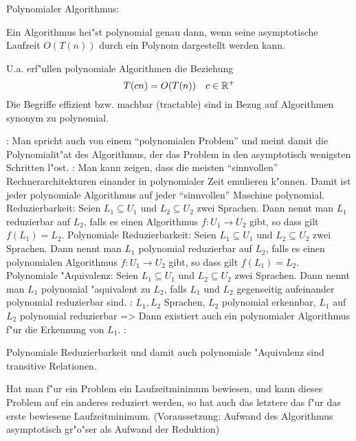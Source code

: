  Polynomialer Algorithmus:{
  Ein Algorithmus hei"st polynomial genau dann, wenn 
  seine asymptotische Laufzeit $O(T(n))$ durch ein Polynom dargestellt 
  werden kann.
  
  U.a. erf"ullen polynomiale Algorithmen die Beziehung
  \[
    T(cn)=O(T(n))\quad c\in\mathbb R^+
  \]
  Die Begriffe effizient bzw. machbar (tractable) sind in Bezug auf
  Algorithmen synonym zu polynomial.
}
\remark:{
  Man spricht auch von einem ``polynomialen Problem'' und meint damit
  die Polynomialit"at des Algorithmus, der das Problem in den asymptotisch
  wenigsten Schritten l"ost.
}
\remark:{
  Man kann zeigen, dass die meisten ``sinnvollen'' Rechnerarchitekturen
  einander in polynomialer Zeit emulieren k"onnen. Damit ist jeder 
  polynomiale Algorithmus auf jeder ``sinnvollen'' Maschine polynomial.
}
 Reduzierbarkeit:{
  Seien $L_1\subseteq U_1$ und $L_2\subseteq U_2$ zwei Sprachen.
  Dann nennt man $L_1$ reduzierbar auf $L_2$, falls es einen
  Algorithmus $f:U_1\to U_2$ gibt, so dass gilt $f(L_1)=L_2$.
}
 Polynomiale Reduzierbarkeit:{
  Seien $L_1\subseteq U_1$ und $L_2\subseteq U_2$ zwei Sprachen.
  Dann nennt man $L_1$ polynomial reduzierbar auf $L_2$, falls es einen
  polynomialen Algorithmus $f:U_1\to U_2$ gibt, so dass gilt $f(L_1)=L_2$.
}
 Polynomiale "Aquivalenz:{
  Seien $L_1\subseteq U_1$ und $L_2\subseteq U_2$ zwei Sprachen.
  Dann nennt man $L_1$ polynomial "aquivalent zu $L_2$, falls
  $L_1$ und $L_2$ gegenseitig aufeinander polynomial reduzierbar sind.
}
\theorem:
  $L_1, L_2$ Sprachen, $L_2$ polynomial erkennbar, $L_1$ auf $L_2$
  polynomial reduzierbar
  =>
{
  Dann existiert auch ein polynomialer Algorithmus f"ur die Erkennung
  von $L_1$.
}
\remark:{
  Polynomiale Reduzierbarkeit und damit auch polynomiale "Aquivalenz sind
  transitive Relationen.
  
  Hat man f"ur ein Problem ein Laufzeitminimum bewiesen, und kann dieses
  Problem auf ein anderes reduziert werden, so hat auch das letztere
  das f"ur das erste bewiesene Laufzeitminimum. (Voraussetzung: 
  Aufwand des Algorithmus asymptotisch gr"o"ser als Aufwand der
  Reduktion)
}
